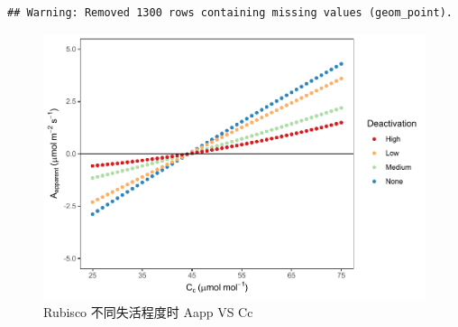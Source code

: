 \documentclass[
]{krantz}
\begin{document}
\begin{verbatim}
## Warning: Removed 1300 rows containing missing values (geom_point).
\end{verbatim}

\begin{figure}
\centering
\includegraphics{bookdown_files/figure-latex/aappdeccc-1.pdf}
\caption{\label{fig:aappdeccc}Rubisco 不同失活程度时 Aapp VS Cc}
\end{figure}
\end{document}
